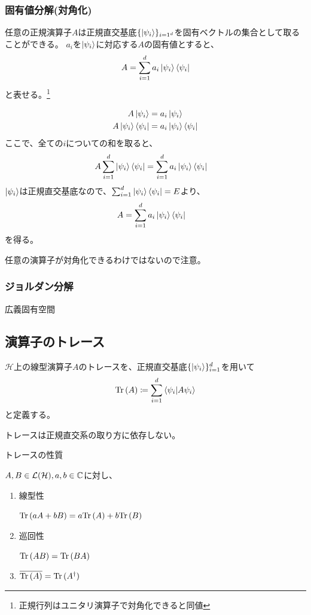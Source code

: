 \subsubsection{固有値分解(対角化)}
\begin{Def}
  任意の正規演算子$A$は正規直交基底$\{\ket{\psi_i}\}_{i=1^d}$を固有ベクトルの集合として取ることができる。
  $a_i$を$\ket{\psi_i}$に対応する$A$の固有値とすると、
  $$
  A = \sum_{i=1}^d a_i \ket{\psi_i}\bra{\psi_i}
  $$
  と表せる。\footnote{正規行列はユニタリ演算子で対角化できると同値}
\end{Def}
\proof
\begin{align}
  A\ket{\psi_i} &= a_i\ket{\psi_i} \\
  A\ket{\psi_i}\bra{\psi_i} &= a_i\ket{\psi_i}\bra{\psi_i}
\end{align}
ここで、全ての$i$についての和を取ると、
\begin{align}
  A\sum_{i=1}^d \ket{\psi_i}\bra{\psi_i} &= \sum_{i=1}^d a_i\ket{\psi_i}\bra{\psi_i}
\end{align}
$\ket{\psi_i}$は正規直交基底なので、$\sum_{i=1}^d \ket{\psi_i}\bra{\psi_i} = E$より、
\begin{align}
  A &= \sum_{i=1}^d a_i\ket{\psi_i}\bra{\psi_i}
\end{align}
を得る。

任意の演算子が対角化できるわけではないので注意。

\subsubsection{ジョルダン分解}
\begin{Memo}
  広義固有空間
\end{Memo}

\subsection{演算子のトレース}
\begin{Def}
  $\mathcal{H}$上の線型演算子$A$のトレースを、正規直交基底$\{\ket{\psi_i}\}_{i=1}^d$を用いて
$$
  \text{Tr}\,(A)\coloneqq \sum_{i=1}^d\braket{\psi_i|A\psi_i}
$$
と定義する。
\end{Def}
トレースは正規直交系の取り方に依存しない。

\begin{Prop} トレースの性質

  $A,B\in \mathcal{L}(\mathcal{H}),a,b\in\mathbb{C}$に対し、
  \begin{enumerate}
    \item 線型性

    $\text{Tr}\,(aA+bB) = a\text{Tr}\,(A) + b\text{Tr}\,(B)$

    \item 巡回性

    $\text{Tr}\,(AB) = \text{Tr}\,(BA)$

    \item $\overline{\text{Tr}\,(A)} = \text{Tr}\,(A^\dagger)$
  \end{enumerate}
\end{Prop}

